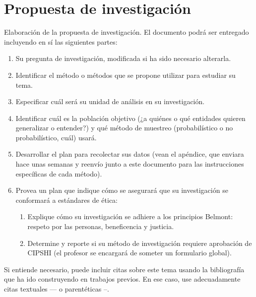 \documentclass[11pt]{article}
\begin{document}
\section*{Propuesta de investigación}
Elaboración de la propuesta de investigación. El documento podrá ser entregado incluyendo en sí las siguientes partes:

\begin{enumerate}
    \item[1.º] Su pregunta de investigación, modificada si ha sido necesario alterarla.
    \item[2.º] Identificar el método o métodos que se propone utilizar para estudiar su tema.
    \item[3.º] Especificar cuál será su unidad de análisis en su investigación.
    \item[4.º] Identificar cuál es la población objetivo (¿a quiénes o qué entidades quieren generalizar o entender?) y qué método de muestreo (probabilístico o no probabilístico, cuál) usará.
    \item[5.º] Desarrollar el plan para recolectar sus datos (vean el apéndice, que enviara hace unas semanas y reenvío junto a este documento para las instrucciones específicas de cada método).
    \item[6.º] Provea un plan que indique cómo se asegurará que su investigación se conformará a estándares de ética:
    \begin{enumerate}
        \item Explique cómo su investigación se adhiere a los principios Belmont: respeto por las personas, beneficencia y justicia.
        \item Determine y reporte si su método de investigación requiere aprobación de CIPSHI (el profesor se encargará de someter un formulario global).
    \end{enumerate}
\end{enumerate}



Si entiende necesario, puede incluir citas sobre este tema usando la bibliografía que ha ido construyendo en trabajos previos. En ese caso, use adecuadamente citas textuales --\citet{hall2001introduction}-- o parentéticas --\citep[e.g.,][, entre otros]{hall2009institutional}.

\printbibliography[title={Bibliografía}, heading=subbibliography]
\end{document}
